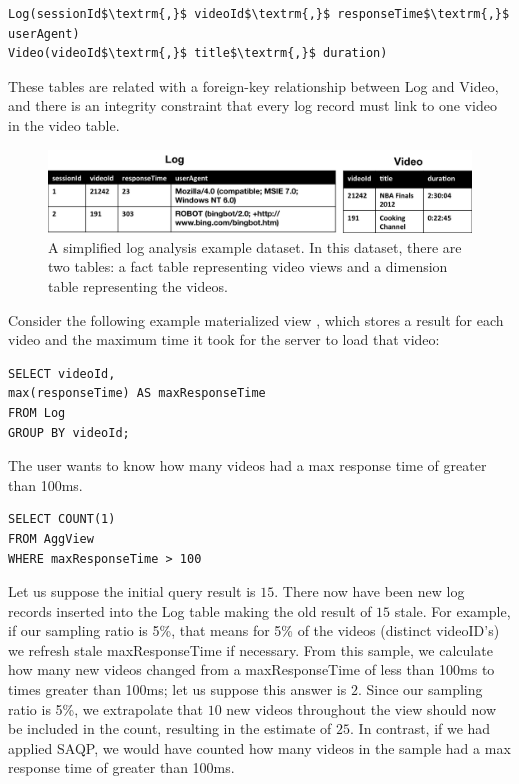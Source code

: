 \begin{lstlisting}[mathescape]
Log(sessionId$\textrm{,}$ videoId$\textrm{,}$ responseTime$\textrm{,}$ userAgent)
Video(videoId$\textrm{,}$ title$\textrm{,}$ duration)
\end{lstlisting}
These tables are related with a foreign-key relationship between
Log and Video, and there is an integrity constraint that every log
record must link to one video in the video table.

\begin{figure}[ht!] 
\centering
\vspace{-0.75em}
 \includegraphics[width=\columnwidth]{figs/sample-clean-example.png}\vspace{-0.25em}
 \caption{A simplified log analysis example dataset. In this dataset, there are two tables: a fact table representing video views and a dimension table representing the videos.\label{example-1}}
\end{figure}

Consider the following example materialized view \aggview, which stores a result for each video and the maximum time it took for the server to load that video:
\begin{lstlisting} 
SELECT videoId, 
max(responseTime) AS maxResponseTime 
FROM Log 
GROUP BY videoId;
\end{lstlisting}

The user wants to know how many videos had a max response time of greater than 100ms.
\begin{lstlisting} 
SELECT COUNT(1)
FROM AggView
WHERE maxResponseTime > 100
\end{lstlisting}
Let us suppose the initial query result is $15$.
There now have been new log records inserted into the Log table making the old result of $15$ stale.
For example, if our sampling ratio is 5\%, that means for 5\% of the videos (distinct videoID's) we refresh stale maxResponseTime if necessary.
From this sample, we calculate how many new videos changed from a maxResponseTime of less than 100ms to times greater than 100ms; let us suppose this answer is $2$.
Since our sampling ratio is 5\%, we extrapolate that $10$ new videos throughout the view should now be included in the count, resulting in the estimate of $25$.
In contrast, if we had applied SAQP, we would have counted how many videos in the sample had a max response time of greater than 100ms.